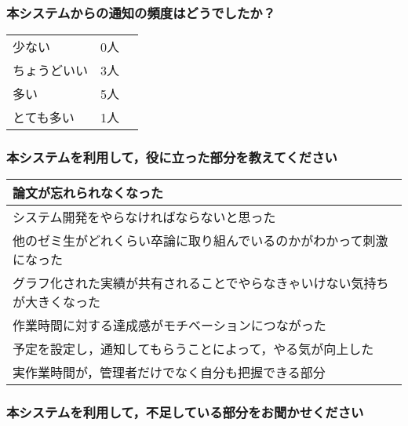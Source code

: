 \subsubsection*{本システムからの通知の頻度はどうでしたか？}

\begin{table}[htb]
  \begin{tabular}{ll}
    少ない & 0人　\\
    ちょうどいい & 3人 \\
    多い & 5人 \\
    とても多い & 1人
  \end{tabular}
\end{table}

\subsubsection*{本システムを利用して，役に立った部分を教えてください}

\begin{table}[htb]
  \begin{tabular}{p{14cm}} \hline
    論文が忘れられなくなった \\ \hline
    システム開発をやらなければならないと思った \\ \hline
    他のゼミ生がどれくらい卒論に取り組んでいるのかがわかって刺激になった \\ \hline
    グラフ化された実績が共有されることでやらなきゃいけない気持ちが大きくなった \\ \hline
    作業時間に対する達成感がモチベーションにつながった \\ \hline
    予定を設定し，通知してもらうことによって，やる気が向上した \\ \hline
    実作業時間が，管理者だけでなく自分も把握できる部分 \\ \hline
  \end{tabular}
\end{table}

\subsubsection*{本システムを利用して，不足している部分をお聞かせください}

